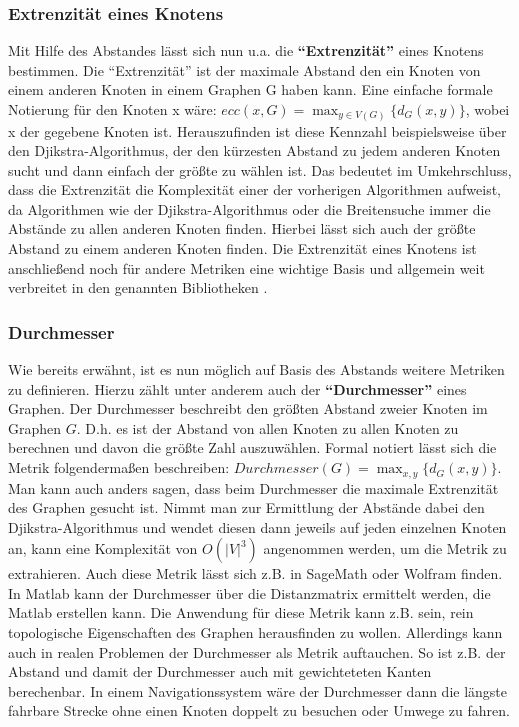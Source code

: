 \documentclass[a4paper,12pt,ngerman,chapterprefix=false,listof=totoc,bibliography=totoc]{scrreprt}
\begin{document}
{\subsubsection*{Extrenzität eines Knotens}
{
Mit Hilfe des Abstandes lässt sich nun u.a. die \textbf{"`Extrenzität"'} eines Knotens bestimmen. Die "`Extrenzität"' ist der maximale Abstand den ein Knoten von einem anderen Knoten in einem Graphen G haben kann. Eine einfache formale Notierung für den Knoten x wäre: \(ecc(x, G)=\max_{y\in V(G)}\{d_G(x,y)\}\), wobei x der gegebene Knoten ist. \cite{harary_graph_2001} Herauszufinden ist diese Kennzahl beispielsweise über den Djikstra-Algorithmus, der den kürzesten Abstand zu jedem anderen Knoten sucht und dann einfach der größte zu wählen ist. Das bedeutet im Umkehrschluss, dass die Extrenzität die Komplexität einer der vorherigen Algorithmen aufweist, da Algorithmen wie der Djikstra-Algorithmus oder die Breitensuche immer die Abstände zu allen anderen Knoten finden. Hierbei lässt sich auch der größte Abstand zu einem anderen Knoten finden. Die Extrenzität eines Knotens ist anschließend noch für andere Metriken eine wichtige Basis und allgemein weit verbreitet in den genannten Bibliotheken \cite{sagemath_graph_2020,matlab_shortest_2020,wolfram_graph_2020}.
}
\subsubsection*{Durchmesser}
{
Wie bereits erwähnt, ist es nun möglich auf Basis des Abstands weitere Metriken zu definieren. Hierzu zählt unter anderem auch der \textbf{"`Durchmesser"'} eines Graphen. Der Durchmesser beschreibt den größten Abstand zweier Knoten im Graphen \(G\). \cite{diestel_graphentheorie_2000} D.h. es ist der Abstand von allen Knoten zu allen Knoten zu berechnen und davon die größte Zahl auszuwählen. Formal notiert lässt sich die Metrik folgendermaßen beschreiben: \(Durchmesser(G)=\max_{x,y}\{ d_G (x,y)\}\). Man kann auch anders sagen, dass beim Durchmesser die maximale Extrenzität des Graphen gesucht ist. Nimmt man zur Ermittlung der Abstände dabei den Djikstra-Algorithmus und wendet diesen dann jeweils auf jeden einzelnen Knoten an, kann eine Komplexität von \(O(\vert V\vert ^3)\) angenommen werden, um die Metrik zu extrahieren. Auch diese Metrik lässt sich z.B. in SageMath oder Wolfram finden. In Matlab kann der Durchmesser über die Distanzmatrix ermittelt werden, die Matlab erstellen kann. \cite{sagemath_graph_2020,matlab_shortest_2020,wolfram_graph_2020} Die Anwendung für diese Metrik kann z.B. sein, rein topologische Eigenschaften des Graphen herausfinden zu wollen. Allerdings kann auch in realen Problemen der Durchmesser als Metrik auftauchen. So ist z.B. der Abstand und damit der Durchmesser auch mit gewichteteten Kanten berechenbar. \cite{sagemath_graph_2020,gitta_durchmesser_2014} In einem Navigationssystem wäre der Durchmesser dann die längste fahrbare Strecke ohne einen Knoten doppelt zu besuchen oder Umwege zu fahren.
}
}
\end{document}
